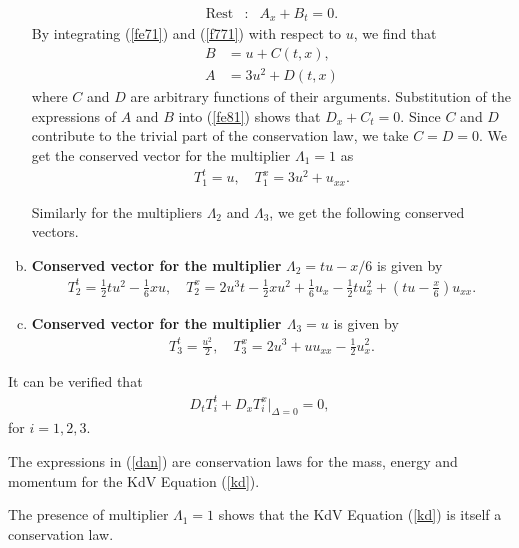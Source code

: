 \begin{enumerate}[(a)]
\begin{eqnarray}
	\label{fe81} \text{Rest} &:& A_x+B_t =0.
	\end{eqnarray} 
By integrating   (\ref{fe71}) and (\ref{f771}) with respect to $u$, we find that \begin{align}
 B&=u+C(t,x),\\
 	A&=3 u^2+D(t,x)
	\end{align}  where $C$ and $D$ are arbitrary functions of their arguments.	Substitution of the expressions of $A$ and $B$ into  (\ref{fe81}) shows  that $D_x+C_t=0$. Since $C$ and $D$ contribute to the trivial part of the  conservation law, we  take $C=D=0$. We get the conserved vector for the multiplier $ \Lambda_1= 1$ as \begin{align}
	 T_1^t= u,\quad  T_1^x=3u^2 + u_{xx}.
	 \end{align}	
\begin{rem}
	Similarly for the multipliers $ \Lambda_{2}$ and $ \Lambda_{3}$, we get the following conserved vectors.
\end{rem}
	\item \textbf{Conserved vector for the multiplier} 	$\Lambda_2 =  tu-x /6$ is given by
 \begin{align}
 T_2^t=  \frac{1 }{2}tu^2-\frac{1}{6}xu, \quad 
 T_2^x=2 u^3t-\frac{1}{2} xu^2+ \frac{1}{6}u_x-\frac{1}{2}tu_x^2+ \left(tu-\frac{x }{6} \right)  u_{xx}.
 \end{align}
 
	\item \textbf{Conserved vector  for the \label{sec2} multiplier $\Lambda_3=  u$} is given by
 \begin{align}
T_3^t=\frac{u^2}{2},\quad 
T_3^x= 2 u^3+ u u_{xx}-\frac{1}{2} u_{x}^2.
\end{align}		
\end{enumerate}
\begin{rem}
It can be verified that\begin{align}D_t T^t_i + D_xT^x_i \Big|_{\Delta =0}=0, \label{dan}
\end{align} for $i =1,2,3$. \end{rem}
\begin{rem} The expressions in (\ref{dan}) are conservation laws for the mass, energy and  momentum  for  the KdV Equation (\ref{kd}).
\end{rem}
\begin{rem} The presence of multiplier   $\Lambda_1=1$ shows that the KdV 
	Equation (\ref{kd}) is itself a conservation law.
\end{rem}
